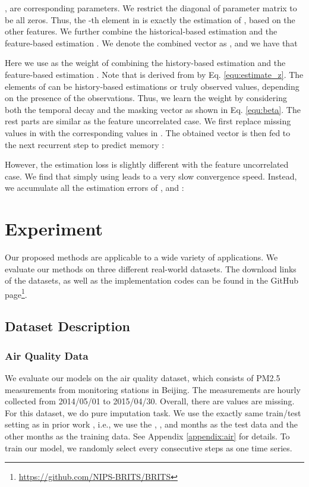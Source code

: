 \documentclass{article}
\begin{document}
,  are corresponding parameters.
We restrict the diagonal of parameter matrix  to be all zeros. Thus, the -th element in  is exactly the estimation of , based on the other features. We further combine the historical-based estimation  and the feature-based estimation . We denote the combined vector as , and we have that

Here we use  as the weight of combining the history-based estimation  and the feature-based estimation . Note that  is derived from  by Eq. \eqref{equ:estimate_z}. The elements of  can be history-based estimations or truly observed values, depending on the presence of the observations. Thus, we learn the weight  by considering both the temporal decay  and the masking vector  as shown in Eq. \eqref{equ:beta}.
The rest parts are similar as the feature uncorrelated case. We first replace missing values in  with the corresponding values in . The obtained vector is then fed to the next recurrent step to predict memory :

However, the estimation loss is slightly different with the feature uncorrelated case. We find that simply using  leads to a very slow convergence speed. Instead, we accumulate all the estimation errors of ,  and :


 \section{Experiment}
\label{sec:exp}
Our proposed methods are applicable to a wide variety of applications. We evaluate our methods on three different real-world datasets. The download links of the datasets, as well as the implementation codes can be found in the GitHub page\footnote{\url{https://github.com/NIPS-BRITS/BRITS}}.

\subsection{Dataset Description}





\subsubsection{Air Quality Data}
We evaluate our models on the air quality dataset, which consists of PM2.5 measurements from  monitoring stations in Beijing. The measurements are hourly collected  from 2014/05/01 to 2015/04/30. Overall, there are  values are missing. For this dataset, we do pure imputation task. We use the exactly same train/test  setting as in prior work \cite{yi2016st}, i.e., we use the , ,  and  months as the test data and the other months as the training data. See Appendix \ref{appendix:air} for details. To train our model, we randomly select every  consecutive steps as one time series. 
\end{document}
